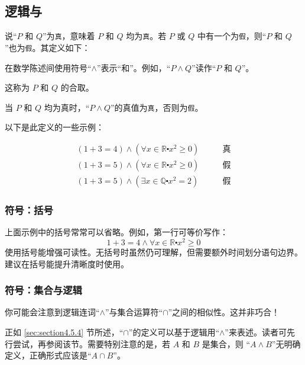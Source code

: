 \subsection{逻辑与}

说``$P$ 和 $Q$''为\verb|真|，意味着 $P$ 和 $Q$ 均为\verb|真|。若 $P$ 或 $Q$ 中有一个为\verb|假|，则``$P$ 和 $Q$''也为\verb|假|。其定义如下：

\begin{definition}
    在数学陈述间使用符号``$\land$''表示``和''。例如，``$P \land Q$''读作``$P$ 和 $Q$''。

    这称为 $P$ 和 $Q$ 的合取。

    当 $P$ 和 $Q$ 均为真时，``$P \land Q$''的真值为\verb|真|，否则为\verb|假|。
\end{definition}

以下是此定义的一些示例：

\begin{example}
    \begin{align*}
        (1 + 3 = 4) \land (\forall x \in \mathbb{R} \centerdot x^2 \ge 0) \qquad &\text{真} \\
        (1 + 3 = 5) \land (\forall x \in \mathbb{R} \centerdot x^2 \ge 0) \qquad &\text{假} \\
        (1 + 3 = 5) \land (\exists x \in \mathbb{Q} \centerdot x^2 = 2)   \qquad &\text{假}
    \end{align*}
\end{example}

\subsubsection*{符号：括号}

上面示例中的括号常常可以省略。例如，第一行可等价写作：
\[1 + 3 = 4 \land \forall x \in \mathbb{R} \centerdot x^2 \ge 0\]
使用括号能增强可读性。无括号时虽然仍可理解，但需要额外时间划分语句边界。建议在括号能提升清晰度时使用。

\subsubsection*{符号：集合与逻辑}

你可能会注意到逻辑连词``$\land$''与集合运算符``$\cap$''之间的相似性。这并非巧合！

正如 \ref{sec:section4.5.4} 节所述，``$\cap$''的定义可以基于逻辑用``$\land$''来表述。读者可先行尝试，再参阅该节。需要特别注意的是，若 $A$ 和 $B$ 是集合，则 ``$A \land B$''无明确定义，正确形式应该是``$A \cap B$''。
